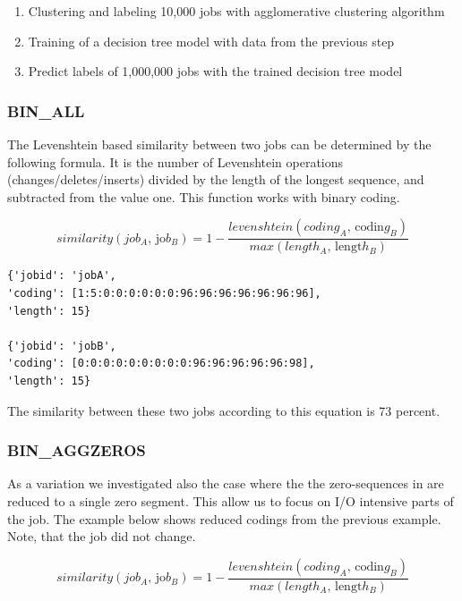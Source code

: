\documentclass[]{llncs}
\begin{document}
\begin{enumerate}
 \item Clustering and labeling 10,000 jobs with agglomerative clustering algorithm
 \item Training of a decision tree model with data from the previous step
 \item Predict labels of 1,000,000 jobs with the trained decision tree model
\end{enumerate}

\subsubsection{BIN\_ALL}
The Levenshtein based similarity between two jobs can be determined by the following formula.
It is the number of Levenshtein operations (changes/deletes/inserts) divided by the length of the longest sequence, and subtracted from the value one.
This function works with binary coding.

\begin{equation}
similarity \left( job_{A}\text{, jo}b_{B} \right) =1- \frac{levenshtein \left( coding_{A}\text{, codin}g_{B} \right) }{max \left( length_{A}\text{, lengt}h_{B} \right) }
\end{equation}

\begin{lstlisting}
{'jobid': 'jobA',
'coding': [1:5:0:0:0:0:0:0:96:96:96:96:96:96:96],
'length': 15} 

{'jobid': 'jobB',
'coding': [0:0:0:0:0:0:0:0:0:96:96:96:96:96:98],
'length': 15}
\end{lstlisting}

The similarity between these two jobs according to this equation is 73 percent.

\subsubsection{BIN\_AGGZEROS}
As a variation we investigated also the case where the the zero-sequences in are reduced to a single zero segment. This allow us to focus on I/O intensive parts of the job. The example below shows reduced codings from the previous example. Note, that the job did not change.

\begin{equation}
similarity \left( job_{A}\text{, jo}b_{B} \right) =1- \frac{levenshtein \left( coding_{A}\text{, codin}g_{B} \right) }{max \left( length_{A}\text{, lengt}h_{B} \right) }
\end{equation}
\end{document}
